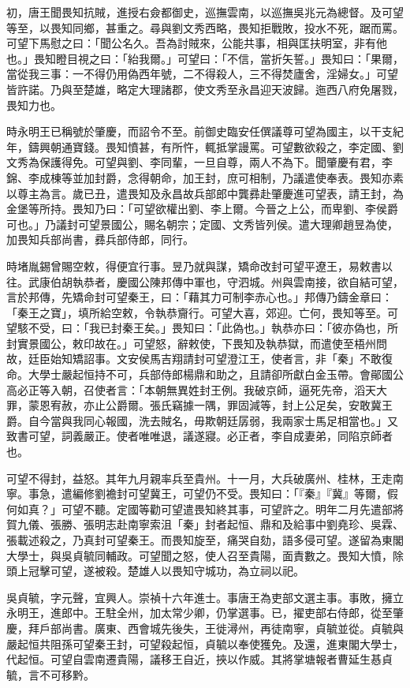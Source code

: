\begin{pinyinscope}
初，唐王聞畏知抗賊，進授右僉都御史，巡撫雲南，以巡撫吳兆元為總督。及可望等至，以畏知同鄉，甚重之。尋與劉文秀西略，畏知拒戰敗，投水不死，踞而罵。可望下馬慰之曰：「聞公名久。吾為討賊來，公能共事，相與匡扶明室，非有他也。」畏知瞪目視之曰：「紿我爾。」可望曰：「不信，當折矢誓。」畏知曰：「果爾，當從我三事：一不得仍用偽西年號，二不得殺人，三不得焚廬舍，淫婦女。」可望皆許諾。乃與至楚雄，略定大理諸郡，使文秀至永昌迎天波歸。迤西八府免屠戮，畏知力也。

時永明王已稱號於肇慶，而詔令不至。前御史臨安任僎議尊可望為國主，以干支紀年，鑄興朝通寶錢。畏知憤甚，有所忤，輒抵掌謾罵。可望數欲殺之，李定國、劉文秀為保護得免。可望與劉、李同輩，一旦自尊，兩人不為下。聞肇慶有君，李錦、李成棟等並加封爵，念得朝命，加王封，庶可相制，乃議遣使奉表。畏知亦素以尊主為言。歲已丑，遣畏知及永昌故兵部郎中龔彞赴肇慶進可望表，請王封，為金堡等所持。畏知乃曰：「可望欲權出劉、李上爾。今晉之上公，而卑劉、李侯爵可也。」乃議封可望景國公，賜名朝宗；定國、文秀皆列侯。遣大理卿趙昱為使，加畏知兵部尚書，彞兵部侍郎，同行。

時堵胤錫曾賜空敕，得便宜行事。昱乃就與謀，矯命改封可望平遼王，易敕書以往。武康伯胡執恭者，慶國公陳邦傳中軍也，守泗城。州與雲南接，欲自結可望，言於邦傳，先矯命封可望秦王，曰：「藉其力可制李赤心也。」邦傳乃鑄金章曰：「秦王之寶」，填所給空敕，令執恭齎行。可望大喜，郊迎。亡何，畏知等至。可望駭不受，曰：「我已封秦王矣。」畏知曰：「此偽也。」執恭亦曰：「彼亦偽也，所封實景國公，敕印故在。」可望怒，辭敕使，下畏知及執恭獄，而遣使至梧州問故，廷臣始知矯詔事。文安侯馬吉翔請封可望澄江王，使者言，非「秦」不敢復命。大學士嚴起恒持不可，兵部侍郎楊鼎和助之，且請卻所獻白金玉帶。會鄖國公高必正等入朝，召使者言：「本朝無異姓封王例。我破京師，逼死先帝，滔天大罪，蒙恩宥赦，亦止公爵爾。張氏竊據一隅，罪固減等，封上公足矣，安敢冀王爵。自今當與我同心報國，洗去賊名，毋欺朝廷孱弱，我兩家士馬足相當也。」又致書可望，詞義嚴正。使者唯唯退，議遂寢。必正者，李自成妻弟，同陷京師者也。

可望不得封，益怒。其年九月親率兵至貴州。十一月，大兵破廣州、桂林，王走南寧。事急，遣編修劉襜封可望冀王，可望仍不受。畏知曰：「『秦』『冀』等爾，假何如真？」可望不聽。定國等勸可望遣畏知終其事，可望許之。明年二月先遣部將賀九儀、張勝、張明志赴南寧索沮「秦」封者起恒、鼎和及給事中劉堯珍、吳霖、張載述殺之，乃真封可望秦王。而畏知旋至，痛哭自劾，語多侵可望。遂留為東閣大學士，與吳貞毓同輔政。可望聞之怒，使人召至貴陽，面責數之。畏知大憤，除頭上冠擊可望，遂被殺。楚雄人以畏知守城功，為立祠以祀。

吳貞毓，字元聲，宜興人。崇禎十六年進士。事唐王為吏部文選主事。事敗，擁立永明王，進郎中。王駐全州，加太常少卿，仍掌選事。已，擢吏部右侍郎，從至肇慶，拜戶部尚書。廣東、西會城先後失，王徙潯州，再徒南寧，貞毓並從。貞毓與嚴起恒共阻孫可望秦王封，可望殺起恒，貞毓以奉使獲免。及還，進東閣大學士，代起恒。可望自雲南遷貴陽，議移王自近，挾以作威。其將掌塘報者曹延生惎貞毓，言不可移黔。


\end{pinyinscope}
